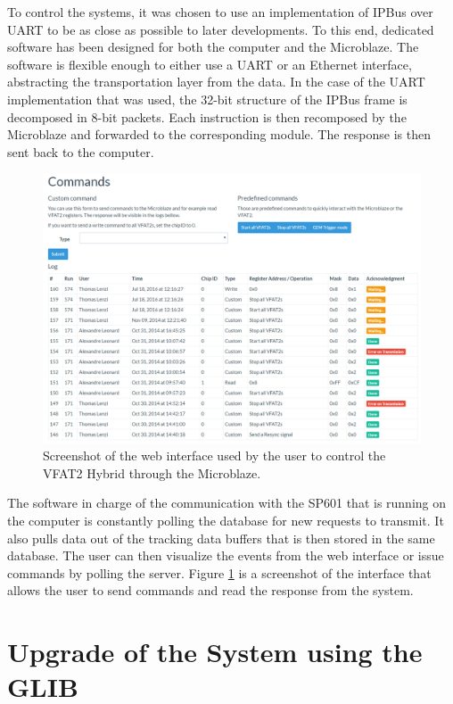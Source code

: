       To control the systems, it was chosen to use an implementation of IPBus over UART to be as close as possible to later developments. To this end, dedicated software has been designed for both the computer and the Microblaze. The software is flexible enough to either use a UART or an Ethernet interface, abstracting the transportation layer from the data. In the case of the UART implementation that was used, the 32-bit structure of the IPBus frame is decomposed in 8-bit packets. Each instruction is then recomposed by the Microblaze and forwarded to the corresponding module. The response is then sent back to the computer. \\

      \begin{figure}[t!]
        \centering
        \includegraphics[width=\textwidth]{img/III-1-arch/app-cmd.png}
        \caption{Screenshot of the web interface used by the user to control the VFAT2 Hybrid through the Microblaze.}
        \label{fig:III-1-app-cmd}
      \end{figure}

      The software in charge of the communication with the SP601 that is running on the computer is constantly polling the database for new requests to transmit. It also pulls data out of the tracking data buffers that is then stored in the same database. The user can then visualize the events from the web interface or issue commands by polling the server. Figure \ref{fig:III-1-app-cmd} is a screenshot of the interface that allows the user to send commands and read the response from the system.

  \section{Upgrade of the System using the GLIB}
  \label{sec:III-1-glib}


